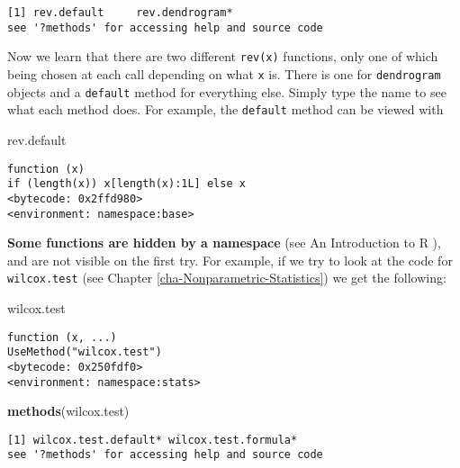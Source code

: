 \documentclass[]{book}
\newenvironment{Shaded}{\begin{snugshade}}{\end{snugshade}}
\newcommand{\KeywordTok}[1]{\textcolor[rgb]{0.13,0.29,0.53}{\textbf{{#1}}}}
\newcommand{\NormalTok}[1]{{#1}}
\numberwithin{equation}{chapter}
\numberwithin{figure}{chapter}
\theoremstyle{plain}
\theoremstyle{definition}
\theoremstyle{remark}
\theoremstyle{definition}
\theoremstyle{definition}
\theoremstyle{remark}
\begin{document}
\begin{verbatim}
[1] rev.default     rev.dendrogram*
see '?methods' for accessing help and source code
\end{verbatim}

Now we learn that there are two different \texttt{rev(x)} functions,
only one of which being chosen at each call depending on what \texttt{x}
is. There is one for \texttt{dendrogram} objects and a \texttt{default}
method for everything else. Simply type the name to see what each method
does. For example, the \texttt{default} method can be viewed with

\begin{Shaded}
\begin{Highlighting}[]
\NormalTok{rev.default}
\end{Highlighting}
\end{Shaded}

\begin{verbatim}
function (x) 
if (length(x)) x[length(x):1L] else x
<bytecode: 0x2ffd980>
<environment: namespace:base>
\end{verbatim}

\textbf{Some functions are hidden by a namespace} (see An Introduction
to R \textcite{Venables2010}), and are not visible on the first try. For
example, if we try to look at the code for \texttt{wilcox.test}
 (see Chapter
\ref{cha-Nonparametric-Statistics}) we get the following:

\begin{Shaded}
\begin{Highlighting}[]
\NormalTok{wilcox.test}
\end{Highlighting}
\end{Shaded}

\begin{verbatim}
function (x, ...) 
UseMethod("wilcox.test")
<bytecode: 0x250fdf0>
<environment: namespace:stats>
\end{verbatim}

\begin{Shaded}
\begin{Highlighting}[]
\KeywordTok{methods}\NormalTok{(wilcox.test)}
\end{Highlighting}
\end{Shaded}

\begin{verbatim}
[1] wilcox.test.default* wilcox.test.formula*
see '?methods' for accessing help and source code
\end{verbatim}
\end{document}
